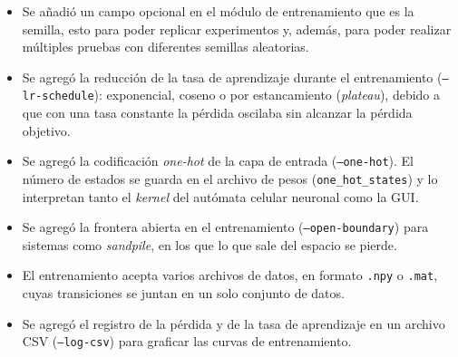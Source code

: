 \begin{itemize}
	\item Se añadió un campo opcional en el módulo de entrenamiento que es la semilla, esto para poder replicar experimentos y, además, para poder realizar múltiples pruebas con diferentes semillas aleatorias.
	\item Se agregó la reducción de la tasa de aprendizaje durante el entrenamiento (\texttt{--lr-schedule}): exponencial, coseno o por estancamiento (\textit{plateau}), debido a que con una tasa constante la pérdida oscilaba sin alcanzar la pérdida objetivo.
	\item Se agregó la codificación \textit{one-hot} de la capa de entrada (\texttt{--one-hot}). El número de estados se guarda en el archivo de pesos (\texttt{one\_hot\_states}) y lo interpretan tanto el \textit{kernel} del autómata celular neuronal como la GUI.
	\item Se agregó la frontera abierta en el entrenamiento (\texttt{--open-boundary}) para sistemas como \textit{sandpile}, en los que lo que sale del espacio se pierde.
	\item El entrenamiento acepta varios archivos de datos, en formato \texttt{.npy} o \texttt{.mat}, cuyas transiciones se juntan en un solo conjunto de datos.
	\item Se agregó el registro de la pérdida y de la tasa de aprendizaje en un archivo CSV (\texttt{--log-csv}) para graficar las curvas de entrenamiento.
\end{itemize}